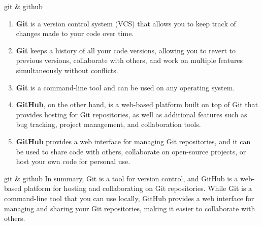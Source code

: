 \begin{frame}
    \begin{content}{git \& github}
        \begin{enumerate}
            \item \textbf{Git} is a version control system (VCS) that allows you to keep track of changes made to your code over time.
            \item \textbf{Git} keeps a history of all your code versions, allowing you to revert to previous versions, collaborate with others, and work on multiple features simultaneously without conflicts.
            \item \textbf{Git} is a command-line tool and can be used on any operating system.
            \item \textbf{GitHub}, on the other hand, is a web-based platform built on top of Git that provides hosting for Git repositories, as well as additional features such as bug tracking, project management, and collaboration tools. 
            \item \textbf{GitHub} provides a web interface for managing Git repositories, and it can be used to share code with others, collaborate on open-source projects, or host your own code for personal use.
        \end{enumerate} 
    \end{content}
\end{frame}
\begin{frame}
    \begin{content}{git \& github}
        In summary, Git is a tool for version control, and GitHub is a web-based platform for hosting and collaborating on Git repositories. While Git is a command-line tool that you can use locally, GitHub provides a web interface for managing and sharing your Git repositories, making it easier to collaborate with others.
    \end{content}
\end{frame}